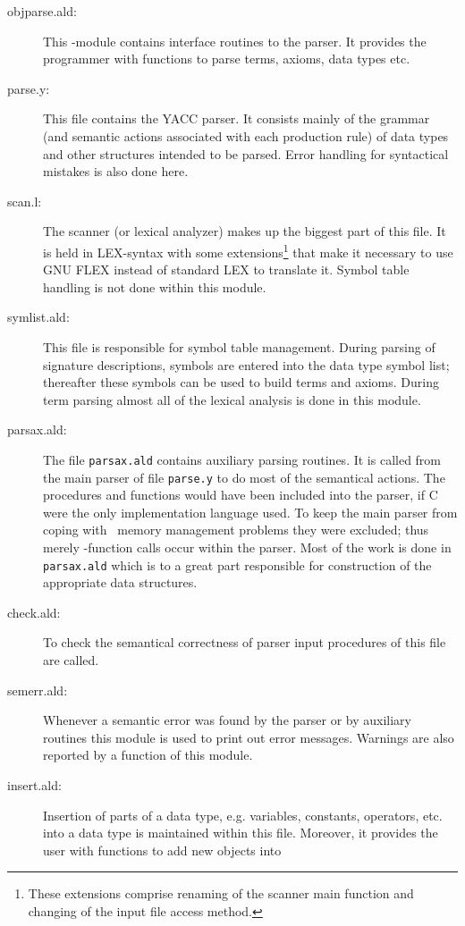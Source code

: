 \begin{description}
\item[objparse.ald:] This \ALDES-module contains interface routines to the
parser. It provides the programmer with functions to parse terms, axioms,
data types etc.
\item[parse.y:] This file contains the YACC parser. It consists mainly of
the grammar (and semantic actions associated with each production rule)
of data types and other structures intended to be parsed.
Error handling for syntactical mistakes is also done here.
\item[scan.l:] The scanner (or lexical analyzer) makes up the biggest part
of this file. It is held in LEX-syntax with some extensions\footnote{These
extensions comprise renaming of the scanner main function and changing
of the input file access method.} that make it
necessary to use GNU FLEX instead of standard LEX to translate it.
Symbol table handling is not done within this module.
\item[symlist.ald:] This file is responsible for symbol table management.
During parsing of signature descriptions, symbols are entered into the
data type symbol list; thereafter these symbols can be used to
build terms and axioms. During term parsing almost all of the lexical
analysis is done in this module.
\item[parsax.ald:] The file {\tt parsax.ald} contains auxiliary parsing
routines. It is called from the main parser of file {\tt parse.y} to
do most of the semantical actions. The procedures and functions would
have been included into the parser, if C were the only implementation
language used. To keep the main parser from coping with \ALDES\ memory
management problems they were excluded;
thus merely \ALDES-function calls occur within the
parser. Most of the work is done in {\tt parsax.ald} which is to a
great part responsible for construction of the appropriate data structures.
\item[check.ald:] To check the semantical correctness of parser input
procedures of this file are called.
\item[semerr.ald:] Whenever a semantic error was found by the parser or
by auxiliary routines this module is used to print out error messages.
Warnings are also reported by a function of this module.
\item[insert.ald:] Insertion of parts of a data type, e.g. variables,
constants, operators, etc. into a data type is maintained within this file. 
Moreover, it provides the user with functions to add new objects into

\end{description}
